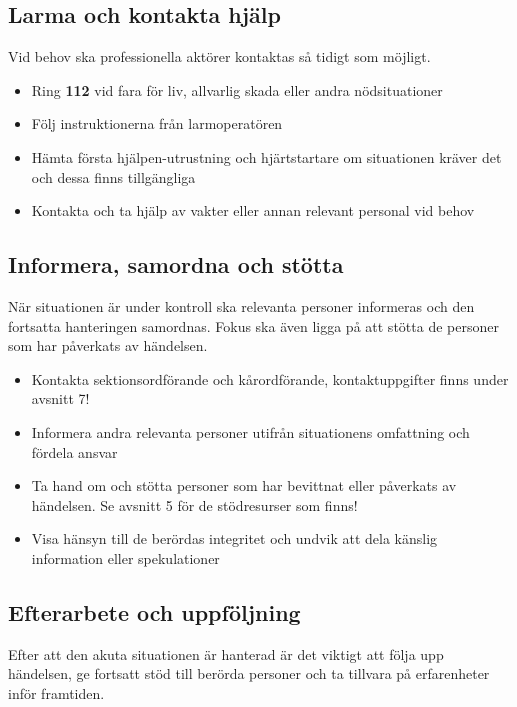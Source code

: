 \documentclass[pdfbookmarks,a4paper,11pt]{article}
\begin{document}
\subsection{Larma och kontakta hjälp}

Vid behov ska professionella aktörer kontaktas så tidigt som möjligt.

\begin{itemize}
    \item Ring \textbf{112} vid fara för liv, allvarlig skada eller andra nödsituationer
    \item Följ instruktionerna från larmoperatören
    \item Hämta första hjälpen-utrustning och hjärtstartare om situationen kräver det och dessa finns tillgängliga
    \item Kontakta och ta hjälp av vakter eller annan relevant personal vid behov
\end{itemize}


\subsection{Informera, samordna och stötta}

När situationen är under kontroll ska relevanta personer informeras och den fortsatta hanteringen samordnas. Fokus ska även ligga på att stötta de personer som har påverkats av händelsen.

\begin{itemize}
    \item Kontakta sektionsordförande och kårordförande, kontaktuppgifter finns under avsnitt 7!
    \item Informera andra relevanta personer utifrån situationens omfattning och fördela ansvar
    \item Ta hand om och stötta personer som har bevittnat eller påverkats av händelsen. Se avsnitt 5 för de stödresurser som finns!
    \item Visa hänsyn till de berördas integritet och undvik att dela känslig information eller spekulationer
\end{itemize}

\subsection{Efterarbete och uppföljning}

Efter att den akuta situationen är hanterad är det viktigt att följa upp händelsen, ge fortsatt stöd till berörda personer och ta tillvara på erfarenheter inför framtiden.
\end{document}
